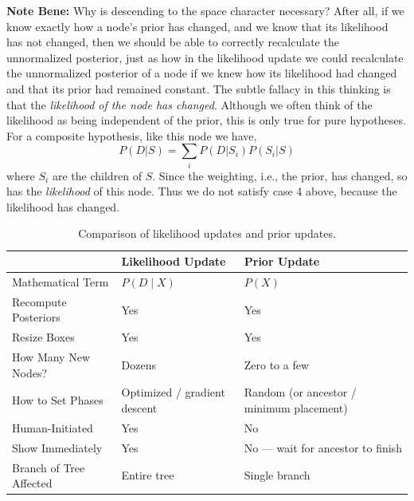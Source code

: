 \textbf{Note Bene:} Why is descending to the space character necessary? After all,
if we know exactly how a node's prior has changed, and we know that its likelihood has not changed,
then we should be able to correctly recalculate the unnormalized posterior, just as how 
in the likelihood update we could recalculate the unnormalized posterior of a node
if we knew how its likelihood had changed and that its prior had remained constant.
The subtle fallacy in this thinking is that the \textit{likelihood of the node has changed}.
Although we often think of the likelihood as being independent of the prior,
this is only true for pure hypotheses. For a composite hypothesis, like this node we have,
$$
P(D | S) = \sum_i P(D | S_i) P(S_i | S)
$$
where $S_i$ are the children of $S$.
Since the weighting, i.e., the prior, has changed, so has the \textit{likelihood}
of this node.
Thus we do not satisfy case 4 above, because the likelihood has changed.


\begin{table}[h]
\centering
\begin{tabular}{lll}
\hline
\textbf{} & \textbf{Likelihood Update} & \textbf{Prior Update} \\
\hline
Mathematical Term       & $P(D \mid X)$                         & $P(X)$ \\
Recompute Posteriors    & Yes                                   & Yes \\
Resize Boxes            & Yes                                   & Yes \\
How Many New Nodes?     & Dozens                                & Zero to a few \\
How to Set Phases       & Optimized / gradient descent          & Random (or ancestor / minimum placement) \\
Human-Initiated         & Yes                                   & No \\
Show Immediately        & Yes                                   & No --- wait for ancestor to finish \\
Branch of Tree Affected & Entire tree                           & Single branch \\
\hline
\end{tabular}
\caption{Comparison of likelihood updates and prior updates.}
\label{tab:updates}
\end{table}